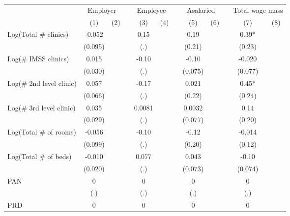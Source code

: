 \begin{tabular}{lccccccccccc}
\toprule
      & \multicolumn{2}{c}{Employer} &       & \multicolumn{2}{c}{Employee} &       & \multicolumn{2}{c}{Asalaried} &       & \multicolumn{2}{c}{Total wage mass} \\
\cmidrule{2-3}\cmidrule{5-6}\cmidrule{8-9}\cmidrule{11-12}      & (1)   & (2)   &       & (3)   & (4)   &       & (5)   & (6)   &       & (7)   & (8) \\
\midrule
\midrule
Log(Total \# clinics) & -0.052 &       &       & 0.15  &       &       & 0.19  &       &       & 0.39* &  \\
      & (0.095) &       &       & (.)   &       &       & (0.21) &       &       & (0.23) &  \\
Log(\# IMSS clinics) & 0.015 &       &       & -0.10 &       &       & -0.10 &       &       & -0.020 &  \\
      & (0.030) &       &       & (.)   &       &       & (0.075) &       &       & (0.077) &  \\
Log(\# 2nd level clinic) & 0.057 &       &       & -0.17 &       &       & 0.021 &       &       & 0.45* &  \\
      & (0.066) &       &       & (.)   &       &       & (0.22) &       &       & (0.24) &  \\
Log(\# 3rd level clinic) & 0.035 &       &       & 0.0081 &       &       & 0.0032 &       &       & 0.14  &  \\
      & (0.029) &       &       & (.)   &       &       & (0.077) &       &       & (0.20) &  \\
Log(Total \# of rooms) & -0.056 &       &       & -0.10 &       &       & -0.12 &       &       & -0.014 &  \\
      & (0.099) &       &       & (.)   &       &       & (0.20) &       &       & (0.12) &  \\
Log(Total \# of beds) & -0.010 &       &       & 0.077 &       &       & 0.043 &       &       & -0.10 &  \\
      & (0.020) &       &       & (.)   &       &       & (0.073) &       &       & (0.074) &  \\
PAN   & 0     &       &       & 0     &       &       & 0     &       &       & 0     &  \\
      & (.)   &       &       & (.)   &       &       & (.)   &       &       & (.)   &  \\
PRD   & 0     &       &       & 0     &       &       & 0     &       &       & 0     &  \\

\end{tabular}
